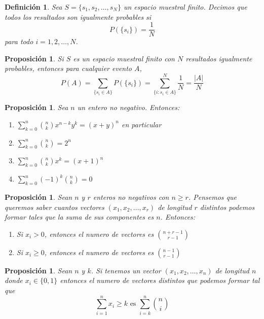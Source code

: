 \documentclass[14pt]{extarticle}
\newtheorem{proposition}[theorem]{Proposición}
\newtheorem{definition}[theorem]{Definición}
\begin{document}
\begin{definition}
    Sea $S = \{s_1, s_2, \ldots, s_N\}$ un espacio muestral finito. Decimos que todos los resultados 
    son igualmente probables si $$P(\{s_i\}) = \frac{1}{N}$$ para todo $i = 1, 2, \ldots, N$.
\end{definition}

\begin{proposition}
    Si $S$ es un espacio muestral finito con $N$ resultados igualmente probables, entonces para cualquier evento $A$,
    \[
        P(A) = \sum_{\{s_i \in A\}} P(\{s_i\}) = \sum_{\{i: s_i \in A\}}^N \frac{1}{N} = \frac{|A|}{N}
    \]
\end{proposition}


\begin{proposition}
    Sea $n$ un entero no negativo. Entonces:
    \begin{enumerate}
        \item $\sum_{k=0}^n \binom{n}{k}x^{n-k}y^k = (x+y)^n$ en particular 
        \item $\sum_{k=0}^n \binom{n}{k} = 2^n$
        \item $\sum_{k=0}^n \binom{n}{k}x^k = (x+1)^n$
        \item $\sum_{k=0}^n (-1)^k \binom{n}{k} = 0$
    \end{enumerate}
\end{proposition}


\begin{proposition}
    Sean $n$ y $r$ enteros no negativos con $n \geq r$. Pensemos que queremos saber cuantos vectores $(x_1, x_2, \ldots, x_r)$ de longitud $r$ distintos
    podemos formar tales que la suma de sus componentes es $n$. Entonces:
    \begin{enumerate}
        \item Si $x_i > 0$, entonces el numero de vectores es $\binom{n + r-1}{r-1}$
        \item Si $x_i \geq 0$, entonces el numero de vectores es $\binom{n-1}{r-1}$
    \end{enumerate}
\end{proposition}
    
\begin{proposition}
    Sean $n$ y $k$. Si tenemos un vector $(x_1, x_2, \ldots, x_n)$ de longitud $n$ 
    donde $x_i \in \{0,1\}$ entonces el numero de vectores distintos que podemos formar tal que 
    \[
        \sum_{i=1}^n x_i \geq k
    \text{    es   }
        \sum_{i=k}^n \binom{n}{i}
    \]
\end{proposition}
\end{document}
